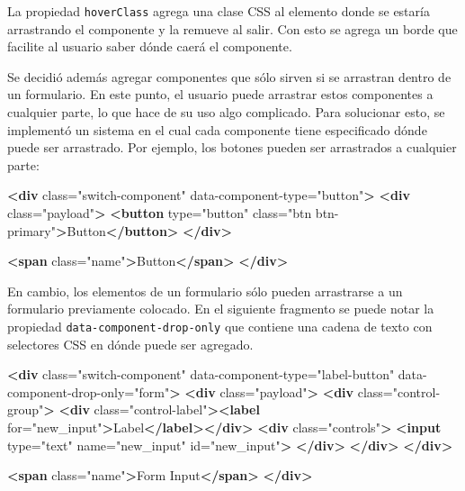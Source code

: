 \documentclass[12pt,titlepage,]{article}
\newenvironment{Shaded}{}{}
\newcommand{\KeywordTok}[1]{\textcolor[rgb]{0.00,0.44,0.13}{\textbf{{#1}}}}
\newcommand{\StringTok}[1]{\textcolor[rgb]{0.25,0.44,0.63}{{#1}}}
\newcommand{\OtherTok}[1]{\textcolor[rgb]{0.00,0.44,0.13}{{#1}}}
\newcommand{\NormalTok}[1]{{#1}}
\begin{document}
La propiedad \texttt{hoverClass} agrega una clase CSS al elemento donde
se estaría arrastrando el componente y la remueve al salir. Con esto se
agrega un borde que facilite al usuario saber dónde caerá el componente.

Se decidió además agregar componentes que sólo sirven si se arrastran
dentro de un formulario. En este punto, el usuario puede arrastrar estos
componentes a cualquier parte, lo que hace de su uso algo complicado.
Para solucionar esto, se implementó un sistema en el cual cada
componente tiene especificado dónde puede ser arrastrado. Por ejemplo,
los botones pueden ser arrastrados a cualquier parte:

\begin{Shaded}
\begin{Highlighting}[]
\KeywordTok{<div}\OtherTok{ class=}\StringTok{"switch-component"}\OtherTok{ data-component-type=}\StringTok{"button"}\KeywordTok{>}
  \KeywordTok{<div}\OtherTok{ class=}\StringTok{"payload"}\KeywordTok{>}
    \KeywordTok{<button}\OtherTok{ type=}\StringTok{"button"}\OtherTok{ class=}\StringTok{"btn btn-primary"}\KeywordTok{>}\NormalTok{Button}\KeywordTok{</button>}
  \KeywordTok{</div>}

  \KeywordTok{<span}\OtherTok{ class=}\StringTok{"name"}\KeywordTok{>}\NormalTok{Button}\KeywordTok{</span>}
\KeywordTok{</div>}
\end{Highlighting}
\end{Shaded}

En cambio, los elementos de un formulario sólo pueden arrastrarse a un
formulario previamente colocado. En el siguiente fragmento se puede
notar la propiedad \texttt{data-component-drop-only} que contiene una
cadena de texto con selectores CSS en dónde puede ser agregado.

\begin{Shaded}
\begin{Highlighting}[]
\KeywordTok{<div}\OtherTok{ class=}\StringTok{"switch-component"}\OtherTok{ data-component-type=}\StringTok{"label-button"} 
\OtherTok{     data-component-drop-only=}\StringTok{"form"}\KeywordTok{>}
  \KeywordTok{<div}\OtherTok{ class=}\StringTok{"payload"}\KeywordTok{>}
    \KeywordTok{<div}\OtherTok{ class=}\StringTok{"control-group"}\KeywordTok{>}
      \KeywordTok{<div}\OtherTok{ class=}\StringTok{"control-label"}\KeywordTok{><label}\OtherTok{ for=}\StringTok{"new_input"}\KeywordTok{>}\NormalTok{Label}\KeywordTok{</label></div>}
      \KeywordTok{<div}\OtherTok{ class=}\StringTok{"controls"}\KeywordTok{>}
        \KeywordTok{<input}\OtherTok{ type=}\StringTok{"text"}\OtherTok{ name=}\StringTok{"new_input"}\OtherTok{ id=}\StringTok{"new_input"}\KeywordTok{>}
      \KeywordTok{</div>}
    \KeywordTok{</div>}
  \KeywordTok{</div>}

  \KeywordTok{<span}\OtherTok{ class=}\StringTok{"name"}\KeywordTok{>}\NormalTok{Form Input}\KeywordTok{</span>}
\KeywordTok{</div>}
\end{Highlighting}
\end{Shaded}
\end{document}
